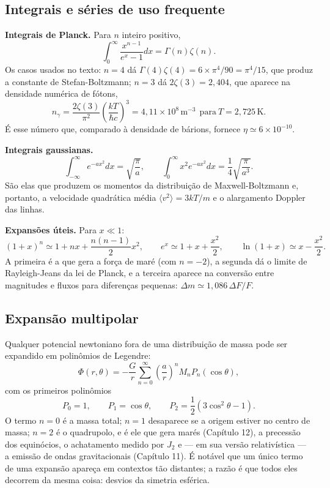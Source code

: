 \documentclass[11pt,a4paper]{article}
\begin{document}
\subsection*{Integrais e séries de uso frequente}

\textbf{Integrais de Planck.} Para $n$ inteiro positivo,
\[
\int_0^{\infty}\frac{x^{n-1}}{e^{x}-1}dx=\Gamma(n)\zeta(n).
\]
Os casos usados no texto: $n=4$ dá $\Gamma(4)\zeta(4)=6\times\pi^{4}/90=\pi^{4}/15$, que produz a constante de Stefan-Boltzmann; $n=3$ dá $2\zeta(3)=2{,}404$, que aparece na densidade numérica de fótons,
\[
n_\gamma=\frac{2\zeta(3)}{\pi^{2}}\left(\frac{kT}{\hbar c}\right)^{3}=4{,}11\times10^{8}\,\mathrm{m^{-3}}
\ \ \text{para}\ T=2{,}725\,\mathrm{K}.
\]
É esse número que, comparado à densidade de bárions, fornece $\eta\simeq6\times10^{-10}$.

\textbf{Integrais gaussianas.}
\[
\int_{-\infty}^{\infty}e^{-ax^{2}}dx=\sqrt{\frac{\pi}{a}},
\qquad
\int_0^{\infty}x^{2}e^{-ax^{2}}dx=\frac{1}{4}\sqrt{\frac{\pi}{a^{3}}}.
\]
São elas que produzem os momentos da distribuição de Maxwell-Boltzmann e, portanto, a velocidade quadrática média $\langle v^{2}\rangle=3kT/m$ e o alargamento Doppler das linhas.

\textbf{Expansões úteis.} Para $x\ll1$:
\[
(1+x)^{n}\simeq1+nx+\frac{n(n-1)}{2}x^{2},
\qquad
e^{x}\simeq1+x+\frac{x^{2}}{2},
\qquad
\ln(1+x)\simeq x-\frac{x^{2}}{2}.
\]
A primeira é a que gera a força de maré (com $n=-2$), a segunda dá o limite de Rayleigh-Jeans da lei de Planck, e a terceira aparece na conversão entre magnitudes e fluxos para diferenças pequenas: $\Delta m\simeq1{,}086\,\Delta F/F$.

\subsection*{Expansão multipolar}

Qualquer potencial newtoniano fora de uma distribuição de massa pode ser expandido em polinômios de Legendre:
\[
\Phi(r,\theta)=-\frac{G}{r}\sum_{n=0}^{\infty}\left(\frac{a}{r}\right)^{n}M_nP_n(\cos\theta),
\]
com os primeiros polinômios
\[
P_0=1,\qquad
P_1=\cos\theta,\qquad
P_2=\frac{1}{2}\left(3\cos^{2}\theta-1\right).
\]
O termo $n=0$ é a massa total; $n=1$ desaparece se a origem estiver no centro de massa; $n=2$ é o quadrupolo, e é ele que gera marés (Capítulo 12), a precessão dos equinócios, o achatamento medido por $J_2$ e --- em sua versão relativística --- a emissão de ondas gravitacionais (Capítulo 11). É notável que um único termo de uma expansão apareça em contextos tão distantes; a razão é que todos eles decorrem da mesma coisa: desvios da simetria esférica.
\end{document}
